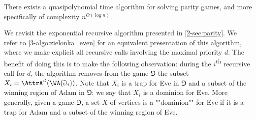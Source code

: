 \begin{theorem}
There exists a quasipolynomial time algorithm for solving parity games, and more specifically of complexity $n^{O(\log n)}$.
\end{theorem}


We revisit the exponential recursive algorithm presented in \cref{2-sec:parity}.
We refer to \cref{3-algo:zielonka_even} for an equivalent presentation of this algorithm, 
where we make explicit all recursive calls involving the maximal priority $d$.
The benefit of doing this is to make the following observation:
during the $i$\textsuperscript{th} recursive call for $d$, the algorithm removes from the game $\Game$ the subset 
$X_i = \AttrA^{\Game}( \WA(\Game_i) )$. 
Note that $X_i$ is a trap for Eve in $\Game$ and a subset of the winning region of Adam in $\Game$:
we say that $X_i$ is a dominion for Eve.
More generally, given a game $\Game$, a set $X$ of vertices is a ""dominion"" for Eve if
it is a trap for Adam and a subset of the winning region of Eve.


